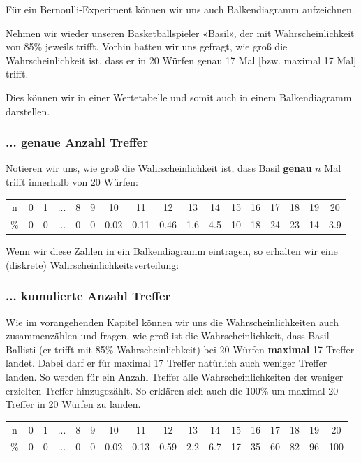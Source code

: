 Für ein Bernoulli-Experiment können wir uns auch Balkendiagramm aufzeichnen.

Nehmen wir wieder unseren Basketballspieler «Basil», der mit Wahrscheinlichkeit von 85\% jeweils trifft. Vorhin hatten wir uns gefragt, wie groß die Wahrscheinlichkeit ist, dass er in 20 Würfen genau 17 Mal [bzw. maximal 17 Mal] trifft.

Dies können wir in einer Wertetabelle und somit auch in einem Balkendiagramm darstellen.
\newpage


\subsubsection{... genaue Anzahl Treffer}
Notieren wir uns, wie groß die Wahrscheinlichkeit ist, dass Basil \textbf{genau} $n$ Mal trifft innerhalb von 20 Würfen:

\begin{tabular}{c|cccccccccccccccc}
  n & 0 & 1 & ... & 8 & 9 & 10   & 11   & 12   & 13  & 14  & 15 & 16 & 17 & 18 & 19 &  20\\
  \%& 0 & 0 & ... & 0 & 0 & 0.02 & 0.11 & 0.46 & 1.6 & 4.5 & 10 & 18 & 24 & 23 & 14 & 3.9
\end{tabular}

Wenn wir diese Zahlen in ein Balkendiagramm eintragen, so erhalten wir
eine (diskrete) Wahrscheinlichkeitsverteilung:




\subsubsection{... kumulierte Anzahl Treffer}
Wie im vorangehenden Kapitel können wir uns die Wahrscheinlichkeiten
auch zusammenzählen und \zB fragen, wie groß ist die
Wahrscheinlichkeit, dass Basil Ballisti (er trifft mit 85\%
Wahrscheinlichkeit) bei 20 Würfen \textbf{maximal} 17
Treffer landet. Dabei darf er für maximal 17 Treffer natürlich auch
weniger Treffer landen. So werden für ein Anzahl Treffer alle
Wahrscheinlichkeiten der weniger erzielten Treffer hinzugezählt. So
erklären sich auch die 100\% um maximal 20 Treffer in 20 Würfen zu
landen.

\begin{tabular}{c|cccccccccccccccc}
  n  & 0 & 1 & ... & 8 & 9 & 10  & 11   & 12   & 13  & 14  & 15 & 16 &  17 & 18 & 19 &  20\\
  \% & 0 & 0 & ... & 0 & 0 &  0.02  &0.13   & 0.59 & 2.2 & 6.7 & 17 & 35 &  60 & 82 & 96 & 100
\end{tabular}

